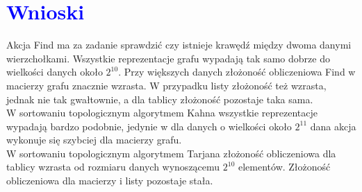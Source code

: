 \documentclass{article}
\begin{document}
	\section*{\textcolor{blue}{Wnioski}}
	
	\noindent Akcja Find ma za zadanie sprawdzić czy istnieje krawędź między dwoma danymi wierzchołkami. Wszystkie reprezentacje grafu wypadają tak samo dobrze do wielkości danych około $2^{10}$. Przy większych danych złożoność obliczeniowa Find w macierzy grafu znacznie wzrasta. W przypadku listy złożoność też wzrasta, jednak nie tak gwałtownie, a dla tablicy złożoność pozostaje taka sama.
	\\ W sortowaniu topologicznym algorytmem Kahna wszystkie reprezentacje wypadają bardzo podobnie, jedynie w dla danych o wielkości około $2^{11}$ dana akcja wykonuje się szybciej dla macierzy grafu.
	\\ W sortowaniu topologicznym algorytmem Tarjana złożoność obliczeniowa dla tablicy wzrasta od rozmiaru danych wynoszącemu $2^{10}$ elementów. Złożoność obliczeniowa dla macierzy i listy pozostaje stała.
	
\end{document}
